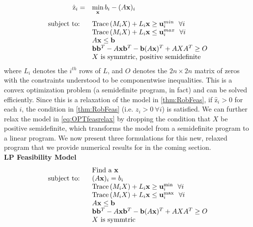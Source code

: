 \begin{equation}\label{eq:OPTfeasrelax}
  \begin{array}{rl}
    \hat{\mathrm{z}}_{i} = & \min\limits_{\vx}  b_i-(A\vx)_i  \\
    \vspace*{-0.05in} \\
    \text{subject to: } \ & \Tr\left(M_iX\right)+ L_i\vx \geq \vu_i^{min} \ \ \forall i\\
    & \Tr\left(M_iX\right)+ L_i\vx \leq \vu_i^{max} \ \ \forall i\\
    &A\vx\leq \vb \\
    &\vb\vb^T-A\vx\vb^T-\vb(A\vx)^T+AXA^T\geq O \\
    &X \text{ is symmtric, positive semidefinite}
  \end{array}
\end{equation}
%
where $L_i$ denotes the $i^{th}$ rows of $L$, and $O$ denotes the $2n \times 2n$ matrix of zeros with the constraints understood to be componentwise inequalities. 
This is a convex optimization problem (a semidefinite program, in fact) and can be solved efficiently. 
Since this is a relaxation of the model in \cref{thm:RobFeas}, if $\hat{\mathrm{z}}_i>0$ for each $i$, the condition in \cref{thm:RobFeas} (i.e. $z_i>0 \ \forall i$) is satisfied. 
We can further relax the model in \cref{eq:OPTfeasrelax} by dropping the condition that $X$ be positive semidefinite, which transforms the model from a semidefinite program to a linear program. 
We now present three formulations for this new, relaxed program that we provide numerical results for in the coming section.\\

\textbf{LP Feasibility Model} 
\begin{equation} \label{eq:OPTfeasrelaxLP1}
\begin{array}{rl}
 &\text{Find a }\mathbf{x} \\
 \text{subject to: } \ &(A\mathbf{x})_i= b_i \\
 &\operatorname{Trace}\left(M_iX\right)+ L_i\mathbf{x} \geq \mathbf{u}_i^{\min}  \ \ \forall i\\
 & \operatorname{Trace}\left(M_iX\right)+ L_i\mathbf{x} \leq \mathbf{u}_i^{\max}  \ \ \forall i\\
 	&A\mathbf{x}\leq \mathbf{b} \\
 	&\mathbf{b}\mathbf{b}^T-A\mathbf{x}\mathbf{b}^T-\mathbf{b}(A\mathbf{x})^T+AXA^T\geq O \\
 	&X \text{ is symmtric}
\end{array}
\end{equation}


